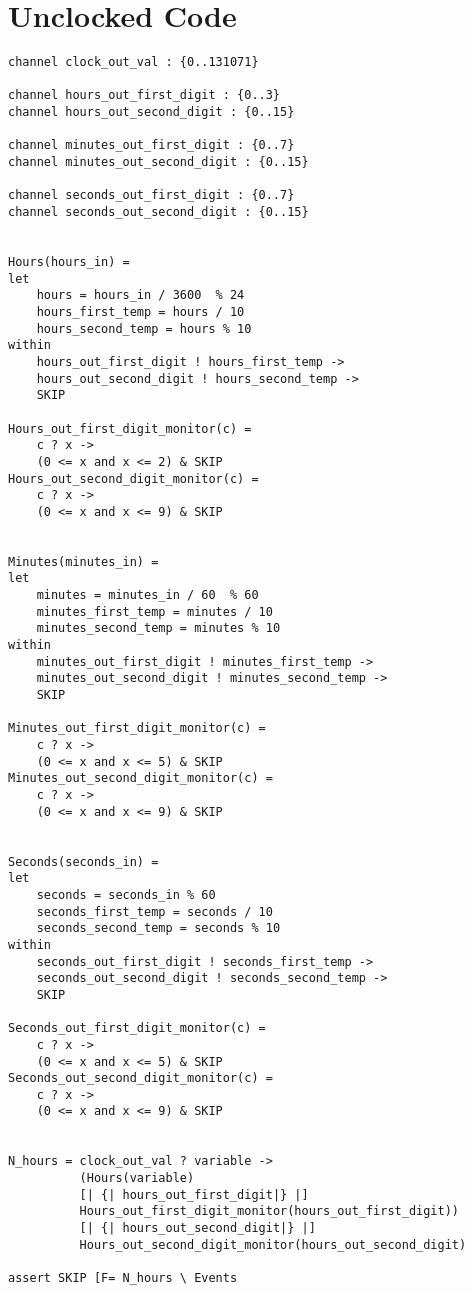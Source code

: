 \section*{Unclocked \cspm{} Code}
\begin{verbatim}
channel clock_out_val : {0..131071}

channel hours_out_first_digit : {0..3}
channel hours_out_second_digit : {0..15}

channel minutes_out_first_digit : {0..7}
channel minutes_out_second_digit : {0..15}

channel seconds_out_first_digit : {0..7}
channel seconds_out_second_digit : {0..15}


Hours(hours_in) =
let
    hours = hours_in / 3600  % 24
    hours_first_temp = hours / 10
    hours_second_temp = hours % 10
within
    hours_out_first_digit ! hours_first_temp ->
    hours_out_second_digit ! hours_second_temp ->
    SKIP

Hours_out_first_digit_monitor(c) =
    c ? x ->
    (0 <= x and x <= 2) & SKIP
Hours_out_second_digit_monitor(c) =
    c ? x ->
    (0 <= x and x <= 9) & SKIP


Minutes(minutes_in) =
let
    minutes = minutes_in / 60  % 60
    minutes_first_temp = minutes / 10
    minutes_second_temp = minutes % 10
within
    minutes_out_first_digit ! minutes_first_temp ->
    minutes_out_second_digit ! minutes_second_temp ->
    SKIP

Minutes_out_first_digit_monitor(c) =
    c ? x ->
    (0 <= x and x <= 5) & SKIP
Minutes_out_second_digit_monitor(c) =
    c ? x ->
    (0 <= x and x <= 9) & SKIP


Seconds(seconds_in) =
let
    seconds = seconds_in % 60
    seconds_first_temp = seconds / 10
    seconds_second_temp = seconds % 10
within
    seconds_out_first_digit ! seconds_first_temp ->
    seconds_out_second_digit ! seconds_second_temp ->
    SKIP

Seconds_out_first_digit_monitor(c) =
    c ? x ->
    (0 <= x and x <= 5) & SKIP
Seconds_out_second_digit_monitor(c) =
    c ? x ->
    (0 <= x and x <= 9) & SKIP


N_hours = clock_out_val ? variable ->
          (Hours(variable)
          [| {| hours_out_first_digit|} |]
          Hours_out_first_digit_monitor(hours_out_first_digit))
          [| {| hours_out_second_digit|} |]
          Hours_out_second_digit_monitor(hours_out_second_digit)

assert SKIP [F= N_hours \ Events



\end{verbatim}
